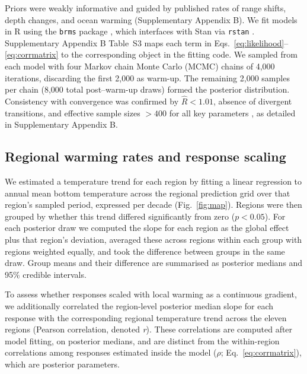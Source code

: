 \documentclass[9pt,twocolumn,twoside]{pnas-new}
\begin{document}
{Priors were weakly informative and guided by published rates of range shifts, depth changes, and ocean warming (Supplementary Appendix B). We fit models in R using the \texttt{brms} package \citep{burkner_brms_2017}, which interfaces with Stan via \texttt{rstan} \citep{stan2024,stan_development_team_rstan_2024}. Supplementary Appendix B Table~S3 maps each term in Eqs.~\ref{eq:likelihood}--\ref{eq:corrmatrix} to the corresponding object in the fitting code. We sampled from each model with four Markov chain Monte Carlo (MCMC) chains of 4,000 iterations, discarding the first 2,000 as warm-up. The remaining 2,000 samples per chain (8,000 total post–warm-up draws) formed the posterior distribution. Consistency with convergence was confirmed by $\hat{R} < 1.01$, absence of divergent transitions, and effective sample sizes $> 400$ for all key parameters \citep{vehtari_rank-normalization_2021}, as detailed in Supplementary Appendix B.

\subsection*{Regional warming rates and response scaling}
We estimated a temperature trend for each region by fitting a linear regression to annual mean bottom temperature across the regional prediction grid over that region's sampled period, expressed per decade (Fig.~\ref{fig:map}). Regions were then grouped by whether this trend differed significantly from zero ($p < 0.05$). For each posterior draw we computed the slope for each region as the global effect plus that region's deviation, averaged these across regions within each group with regions weighted equally, and took the difference between groups in the same draw. Group means and their difference are summarised as posterior medians and 95\% credible intervals.

To assess whether responses scaled with local warming as a continuous gradient, we additionally correlated the region-level posterior median slope for each response with the corresponding regional temperature trend across the eleven regions (Pearson correlation, denoted \textit{r}). These correlations are computed after model fitting, on posterior medians, and are distinct from the within-region correlations among responses estimated inside the model ($\rho$; Eq.~\ref{eq:corrmatrix}), which are posterior parameters.
}


\showmatmethods{} %

\end{document}
